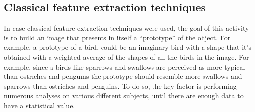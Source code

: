 \documentclass[conference]{IEEEtran}
\begin{document}
		\subsection{Classical feature extraction techniques}
		
			In case classical feature extraction techniques were used, the goal of this activity is to build an image that presents in itself a ``prototype'' of the object. For example, a prototype of a bird, could be 
			an imaginary bird with a shape that it's obtained with a weighted average of the shapes of all the birds in the image. For example, since a birds like sparrows and swallows are perceived as more 
			typical than ostriches and penguins the prototype should resemble more swallows and sparrows than ostriches and penguins. To do so, the key factor is performing numerous analyses on various 
			different subjects, until there are enough data to have a statistical value. 
			
\end{document}
